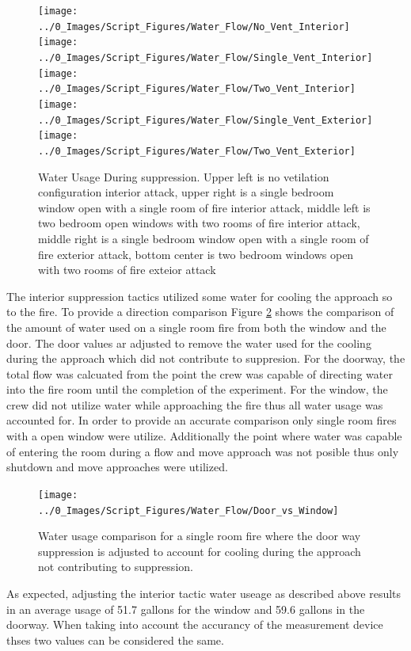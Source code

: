 \documentclass[12pt,oneside]{book}
\begin{document}
\begin{figure}[H]
\centering
\texttt{[image: ../0\_Images/Script\_Figures/Water\_Flow/No\_Vent\_Interior]}
\texttt{[image: ../0\_Images/Script\_Figures/Water\_Flow/Single\_Vent\_Interior]}
\texttt{[image: ../0\_Images/Script\_Figures/Water\_Flow/Two\_Vent\_Interior]}
\texttt{[image: ../0\_Images/Script\_Figures/Water\_Flow/Single\_Vent\_Exterior]}
\texttt{[image: ../0\_Images/Script\_Figures/Water\_Flow/Two\_Vent\_Exterior]}
\caption[Water Usage vs. Ventiltation]{Water Usage During suppression. Upper left is no vetilation configuration interior attack, upper right is a single bedroom window open with a single room of fire interior attack, middle left is two bedroom open windows with two rooms of fire interior attack, middle right is a single bedroom window open with a single room of fire exterior attack, bottom center is two bedroom windows open with two rooms of fire exteior attack}
\label{fig:water_flow_vent_compare}
\end{figure}

The interior suppression tactics utilized some water for cooling the approach so to the fire. To provide a direction comparison Figure \ref{fig:Door_vs_window} shows the comparison of the amount of water used on a single room fire from both the window and the door. The door values ar adjusted to remove the water used for the cooling during the approach which did not contribute to suppresion. For the doorway, the total flow was calcuated from the point the crew was capable of directing water into the fire room until the completion of the experiment. For the window, the crew did not utilize water while approaching the fire thus all water usage was accounted for. In order to provide an accurate comparison only single room fires with a open window were utilize. Additionally the point where water was capable of entering the room during a flow and move approach was not posible thus only shutdown and move approaches were utilized.

\begin{figure}[H]
\centering
\texttt{[image: ../0\_Images/Script\_Figures/Water\_Flow/Door\_vs\_Window]}
\caption[Water Usage For Single Room]{Water usage comparison for a single room fire where the door way suppression is adjusted to account for cooling during the approach not contributing to suppression.}
\label{fig:Door_vs_window}
\end{figure}

As expected, adjusting the interior tactic water useage as described above results in an average usage of 51.7 gallons for the window and 59.6 gallons in the doorway. When taking into account the accurancy of the measurement device thses two values can be considered the same.  
\end{document}
